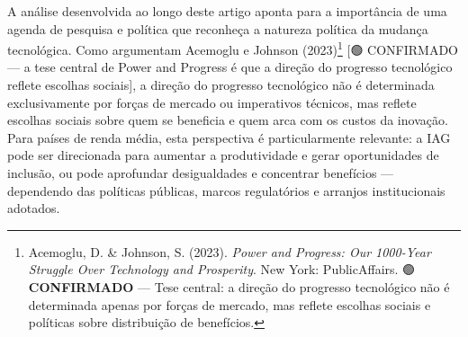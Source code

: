 \documentclass[
  brazilian,
  12pt,
]{article}
\begin{document}
A análise desenvolvida ao longo deste artigo aponta para a importância de uma agenda de pesquisa e política que reconheça a natureza política da mudança tecnológica. Como argumentam Acemoglu e Johnson (2023)\footnote{Acemoglu, D. \& Johnson, S. (2023). \emph{Power and Progress: Our 1000-Year Struggle Over Technology and Prosperity}. New York: PublicAffairs. 🟢 \textbf{CONFIRMADO} --- Tese central: a direção do progresso tecnológico não é determinada apenas por forças de mercado, mas reflete escolhas sociais e políticas sobre distribuição de benefícios.} {[}🟢 CONFIRMADO --- a tese central de Power and Progress é que a direção do progresso tecnológico reflete escolhas sociais{]}, a direção do progresso tecnológico não é determinada exclusivamente por forças de mercado ou imperativos técnicos, mas reflete escolhas sociais sobre quem se beneficia e quem arca com os custos da inovação. Para países de renda média, esta perspectiva é particularmente relevante: a IAG pode ser direcionada para aumentar a produtividade e gerar oportunidades de inclusão, ou pode aprofundar desigualdades e concentrar benefícios --- dependendo das políticas públicas, marcos regulatórios e arranjos institucionais adotados.
\end{document}
